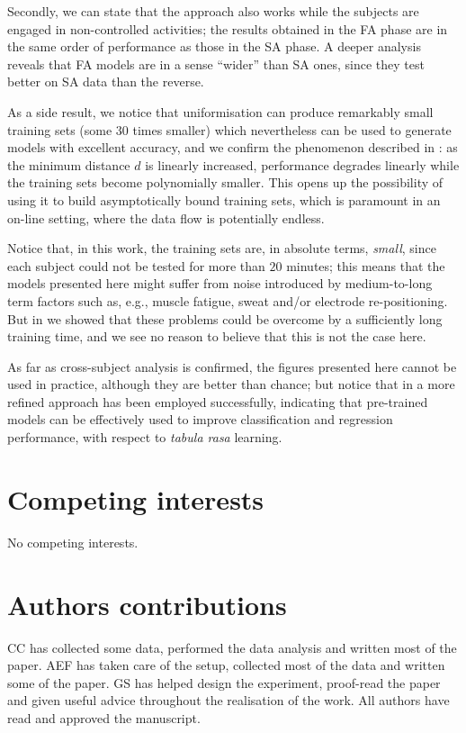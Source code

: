 \documentclass[10pt]{bmc_article}
\newenvironment{bmcformat}{\begin{raggedright}\baselineskip20pt\sloppy\setboolean{publ}{false}}{\end{raggedright}\baselineskip20pt\sloppy}
\begin{document}
\begin{bmcformat}
Secondly, we can state that the approach also works while the subjects
are engaged in non-controlled activities; the results obtained in the
FA phase are in the same order of performance as those in the SA phase.
A deeper analysis reveals that FA models are in a sense ``wider'' than
SA ones, since they test better on SA data than the reverse.

As a side result, we notice that uniformisation can produce remarkably
small training sets (some $30$ times smaller) which nevertheless can be
used to generate models with excellent accuracy, and we confirm
the phenomenon described in \cite{2008.BioCyb}: as the minimum distance
$d$ is linearly increased, performance degrades linearly
while the training sets become polynomially smaller. This opens up the
possibility of using it to build asymptotically bound training sets,
which is paramount in an on-line setting, where the data flow is
potentially endless.

Notice that, in this work, the training sets
are, in absolute terms, \emph{small}, since each subject could not be
tested for more than $20$ minutes; this means that the models presented
here might suffer from noise introduced by medium-to-long term factors
such as, e.g., muscle fatigue, sweat and/or electrode re-positioning.
But in \cite{2008.BioCyb} we showed that these problems could be overcome
by a sufficiently long training time, and we see no reason to believe that
this is not the case here.

As far as cross-subject analysis is confirmed, the figures presented here
cannot be used in practice, although they are better than chance; but notice
that in \cite{2009.ICRA} a more refined approach has been employed successfully,
indicating that pre-trained models can be effectively used to improve
classification and regression performance, with respect to \emph{tabula rasa}
learning.

\section*{Competing interests}

No competing interests.

\section*{Authors contributions}

CC has collected some data, performed the data analysis and written most of the paper. AEF has taken care of the setup, collected most of the data and written some of the paper. GS has helped design the experiment, proof-read the paper and given useful advice throughout the realisation of the work. All authors have read and approved the manuscript.


\end{bmcformat}
\end{document}
